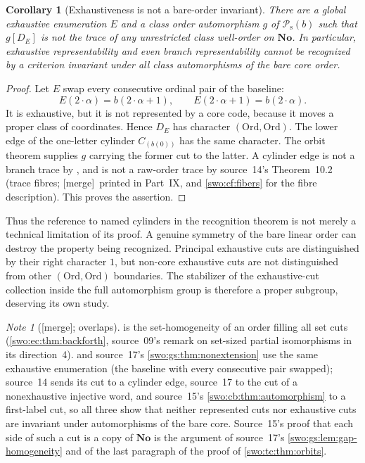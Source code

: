 \documentclass[11pt]{article}
\newtheorem{corollary}[corollary]{Corollary}
\theoremstyle{definition}
\theoremstyle{remark}
\newtheorem{note}[note]{Note}
\newcommand{\No}{\mathbf{No}}
\newcommand{\Ord}{\mathrm{Ord}}
\newcommand{\Psupp}{\mathcal P_{\mathrm{s}}}
\newcommand{\merge}{\textsf{[merge]}}
\begin{document}
\begin{corollary}[Exhaustiveness is not a bare-order invariant]
\label{swo:tc:cor:nonintrinsic}
There are a global exhaustive enumeration $E$ and a class order
automorphism $g$ of $\Psupp(b)$ such that $g[D_E]$ is not the trace of
\emph{any} unrestricted class well-order on $\No$. In particular,
exhaustive representability and even branch representability cannot
be recognized by a criterion invariant under all class automorphisms
of the bare core order.
\end{corollary}
\begin{proof}
Let $E$ swap every consecutive ordinal pair of the baseline:
\[
 E(2\cdot\alpha)=b(2\cdot\alpha+1),\qquad
 E(2\cdot\alpha+1)=b(2\cdot\alpha).
\]
It is exhaustive, but it is not represented by a core code, because
it moves a proper class of coordinates. Hence $D_E$ has character
$(\Ord,\Ord)$. The lower edge of the one-letter cylinder
$C_{(b(0))}$ has the same character. The orbit theorem supplies $g$
carrying the former cut to the latter. A cylinder edge is not a branch
trace by , and is not a raw-order trace by
source~14's Theorem~10.2 (trace fibres; \merge\ printed in Part~IX, and
\cref{swo:cf:fibers} for the fibre description). This proves the assertion.
\end{proof}

Thus the reference to named cylinders in the recognition theorem is
not merely a technical limitation of its proof. A genuine symmetry of
the bare linear order can destroy the property being recognized.
Principal exhaustive cuts are distinguished by their right character
$1$, but non-core exhaustive cuts are not distinguished from other
$(\Ord,\Ord)$ boundaries. The stabilizer of the exhaustive-cut
collection inside the full automorphism group is therefore a proper
subgroup, deserving its own study.

\begin{note}[\merge; overlaps]\label{swo:viii:note:orbits}
 is the set-homogeneity of an order filling
all set cuts (\cref{swo:ec:thm:backforth}, source~09's remark on set-sized
partial isomorphisms in its direction~4).  and
source~17's \cref{swo:gs:thm:nonextension} use the same exhaustive
enumeration (the baseline with every consecutive pair swapped); source~14
sends its cut to a cylinder edge, source~17 to the cut of a nonexhaustive
injective word, and source~15's \cref{swo:cb:thm:automorphism} to a
first-label cut, so all three show that neither represented cuts nor
exhaustive cuts are invariant under automorphisms of the bare core.
Source~15's proof that each side of such a cut is a copy of $\No$ is the
argument of source~17's \cref{swo:gs:lem:gap-homogeneity} and of the last
paragraph of the proof of \cref{swo:tc:thm:orbits}.
\end{note}
\end{document}
